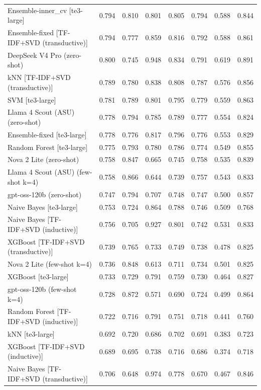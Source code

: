 \begin{table}[htbp]
\begin{tabular}{lccccccc}
Ensemble-inner\_cv [te3-large] & 0.794 & 0.810 & 0.801 & 0.805 & 0.794 & 0.588 & 0.844 \\
Ensemble-fixed [TF-IDF+SVD (transductive)] & 0.794 & 0.777 & 0.859 & 0.816 & 0.792 & 0.588 & 0.861 \\
DeepSeek V4 Pro (zero-shot) & 0.800 & 0.745 & 0.948 & 0.834 & 0.791 & 0.619 & 0.891 \\
kNN [TF-IDF+SVD (transductive)] & 0.789 & 0.780 & 0.838 & 0.808 & 0.787 & 0.576 & 0.856 \\
SVM [te3-large] & 0.781 & 0.789 & 0.801 & 0.795 & 0.779 & 0.559 & 0.863 \\
Llama 4 Scout (ASU) (zero-shot) & 0.778 & 0.794 & 0.785 & 0.789 & 0.777 & 0.554 & 0.824 \\
Ensemble-fixed [te3-large] & 0.778 & 0.776 & 0.817 & 0.796 & 0.776 & 0.553 & 0.829 \\
Random Forest [te3-large] & 0.775 & 0.793 & 0.780 & 0.786 & 0.774 & 0.549 & 0.855 \\
Nova 2 Lite (zero-shot) & 0.758 & 0.847 & 0.665 & 0.745 & 0.758 & 0.535 & 0.839 \\
Llama 4 Scout (ASU) (few-shot k=4) & 0.758 & 0.866 & 0.644 & 0.739 & 0.757 & 0.543 & 0.833 \\
gpt-oss-120b (zero-shot) & 0.747 & 0.794 & 0.707 & 0.748 & 0.747 & 0.500 & 0.857 \\
Naive Bayes [te3-large] & 0.753 & 0.724 & 0.864 & 0.788 & 0.746 & 0.509 & 0.768 \\
Naive Bayes [TF-IDF+SVD (inductive)] & 0.756 & 0.705 & 0.927 & 0.801 & 0.742 & 0.531 & 0.833 \\
XGBoost [TF-IDF+SVD (transductive)] & 0.739 & 0.765 & 0.733 & 0.749 & 0.738 & 0.478 & 0.825 \\
Nova 2 Lite (few-shot k=4) & 0.736 & 0.848 & 0.613 & 0.711 & 0.734 & 0.501 & 0.825 \\
XGBoost [te3-large] & 0.733 & 0.729 & 0.791 & 0.759 & 0.730 & 0.464 & 0.827 \\
gpt-oss-120b (few-shot k=4) & 0.728 & 0.872 & 0.571 & 0.690 & 0.724 & 0.499 & 0.864 \\
Random Forest [TF-IDF+SVD (inductive)] & 0.722 & 0.716 & 0.791 & 0.751 & 0.718 & 0.441 & 0.760 \\
kNN [te3-large] & 0.692 & 0.720 & 0.686 & 0.702 & 0.691 & 0.383 & 0.723 \\
XGBoost [TF-IDF+SVD (inductive)] & 0.689 & 0.695 & 0.738 & 0.716 & 0.686 & 0.374 & 0.718 \\
Naive Bayes [TF-IDF+SVD (transductive)] & 0.706 & 0.648 & 0.974 & 0.778 & 0.670 & 0.467 & 0.846 \\

\end{tabular}
\end{table}
